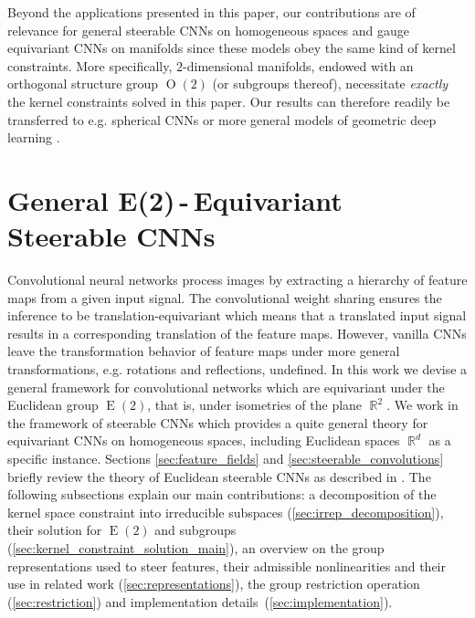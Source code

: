 \documentclass{article}
\DeclareMathOperator*{\R}{\mathbb{R}}
\newcommand{\E}[1]{\ensuremath{\operatorname{E}(#1)}}
\renewcommand{\O}[1]{\ensuremath{\operatorname{O}(#1)}}
\newlength{\secBefore}
\newlength{\secAfter}
\begin{document}
Beyond the applications presented in this paper, our contributions are of relevance for general steerable CNNs on homogeneous spaces \cite{Cohen2018-IIR,generaltheory} and gauge equivariant CNNs on manifolds \cite{gauge} since these models obey the same kind of kernel constraints.
More specifically, $2$-dimensional manifolds, endowed with an orthogonal structure group $\O2$ (or subgroups thereof), necessitate \emph{exactly} the kernel constraints solved in this paper.
Our results can therefore readily be transferred to e.g. spherical CNNs 
\cite{Cohen2018-S2CNN,gauge,kondorClebschGordanNets2018,estevesLearningEquivariantRepresentations2018,perraudinDeepSphereEfficientSpherical2018,jiang2019spherical}
or more general models of geometric deep learning
\cite{poulenardMultidirectionalGeodesicNeural2018a,masciGeodesicConvolutionalNeural2015,brunaSpectralNetworksDeep,boscainiLearningClassSpecific2015}.


 	

\vspace*{\secBefore}
\section{General E(2)\,-\,Equivariant Steerable CNNs}
\label{sec:e2cnns}
\vspace*{\secAfter}

Convolutional neural networks process images by extracting a hierarchy of feature maps from a given input signal.
The convolutional weight sharing ensures the inference to be translation-equivariant which means that a translated input signal results in a corresponding translation of the feature maps.
However, vanilla CNNs leave the transformation behavior of feature maps under more general transformations, e.g. rotations and reflections, undefined.
In this work we devise a general framework for convolutional networks which are equivariant under the Euclidean group $\E2$, that is, under isometries of the plane $\R^2$.
We work in the framework of steerable CNNs
\cite{Cohen2017-STEER,3d_steerableCNNs,Cohen2018-IIR,generaltheory,gauge} 
which provides a quite general theory for equivariant CNNs on homogeneous spaces, including Euclidean spaces $\R^d$ as a specific instance.
Sections \ref{sec:feature_fields} and \ref{sec:steerable_convolutions} briefly review the theory of Euclidean steerable CNNs
as described in \cite{3d_steerableCNNs}.
The following subsections explain our main contributions:
a decomposition of the kernel space constraint into irreducible subspaces (\ref{sec:irrep_decomposition}),
their solution for $\E2$ and subgroups (\ref{sec:kernel_constraint_solution_main}),
an overview on the group representations used to steer features, their admissible nonlinearities and their use in related work (\ref{sec:representations}),
the group restriction operation (\ref{sec:restriction})
and implementation details~(\ref{sec:implementation}). 	
\end{document}
